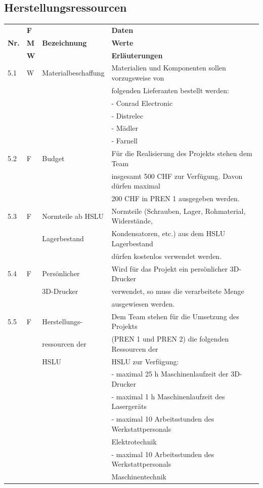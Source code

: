 \documentclass[../main.tex]{subfiles}
\begin{document}
\subsection{Herstellungsressourcen}
\begin{tabular}{|l|l|l|l|}
  \hline
  & \textbf{F} & & \textbf{Daten} \\
  \textbf{Nr.} & \textbf{M} & \textbf{Bezeichnung} & \textbf{Werte} \\
  & \textbf{W} & & \textbf{Erläuterungen} \\
  \hline
  5.1 & W & Materialbeschaffung & Materialien und Komponenten sollen
  vorzugsweise von \\
  & & & folgenden Lieferanten bestellt werden: \\
  & & & - Conrad Electronic \\
  & & & - Distrelec \\
  & & & - Mädler \\
  & & & - Farnell \\
  \hline
  5.2 & F & Budget & Für die Realisierung des Projekts stehen dem Team \\
  & & & insgesamt 500 CHF zur Verfügung. Davon dürfen maximal \\
  & & & 200 CHF in PREN 1 ausgegeben werden. \\
  \hline
  5.3 & F & Normteile ab HSLU & Normteile (Schrauben, Lager,
    Rohmaterial, Widerstände, \\
  & & Lagerbestand & Kondensatoren, etc.) aus dem HSLU Lagerbestand \\
  & & & dürfen kostenlos verwendet werden. \\
  \hline
  5.4 & F & Persönlicher & Wird für das Projekt ein persönlicher 3D-Drucker \\
  & & 3D-Drucker & verwendet, so muss die verarbeitete Menge \\
  & & & ausgewiesen werden. \\
  \hline
  5.5 & F & Herstellungs- & Dem Team stehen für die Umsetzung des Projekts \\
  & & ressourcen der & (PREN 1 und PREN 2) die folgenden Ressourcen der \\
  & & HSLU & HSLU zur Verfügung: \\
  & & & - maximal 25 h Maschinenlaufzeit der 3D-Drucker \\
  & & & - maximal 1 h Maschinenlaufzeit des Lasergeräts \\
  & & & - maximal 10 Arbeitsstunden des Werkstattpersonals \\
  & & &   Elektrotechnik \\
  & & & - maximal 10 Arbeitsstunden des Werkstattpersonals \\
  & & &   Maschinentechnik \\
  \hline
\end{tabular}
\end{document}
